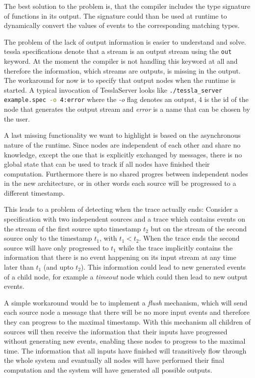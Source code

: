 The best solution to the problem is, that the compiler includes the type signature of functions in its output.
The signature could than be used at runtime to dynamically convert the values of events to the corresponding matching types.

The problem of the lack of output information is easier to understand and solve.
\gls{tessla} specifications denote that a stream is an output stream using the \lstinline{out} keyword.
At the moment the compiler is not handling this keyword at all and therefore the information, which streams are outputs, is missing in the output.
The workaround for now is to specify that output nodes when the runtime is started.
A typical invocation of TesslaServer looks like
\lstinline[breaklines=true,breakatwhitespace=true,language=bash]{./tessla_server example.spec -o 4:error}
where the \emph{-o} flag denotes an output, 4 is the id of the node that generates the output stream and \emph{error} is a name that can be chosen by the user.

A last missing functionality we want to highlight is based on the asynchronous nature of the runtime.
Since nodes are independent of each other and share no knowledge, except the one that is explicitly exchanged by messages, there is no global state that can be used to track if all nodes have finished their computation.
Furthermore there is no shared progres between independent nodes in the new architecture, or in other words each source will be progressed to a different timestamp.

This leads to a problem of detecting when the trace actually ends: Consider a specification with two independent sources and a trace which contains events on the stream of the first source upto timestamp \(t_2\) but on the stream of the second source only to the timestamp \(t_1\), with \(t_1 < t_2\).
When the trace ends the second source will have only progressed to \(t_1\) while the trace implicitly contains the information that there is no event happening on its input stream at any time later than \(t_1\) (and upto \(t_2\)).
This information could lead to new generated events of a child node, for example a \emph{timeout} node which could then lead to new output events.

A simple workaround would be to implement a \emph{flush} mechanism, which will send each source node a message that there will be no more input events and therefore they can progress to the maximal timestamp.
With this mechanism all children of sources will then receive the information that their inputs have progressed without generating new events, enabling these nodes to progress to the maximal time.
The information that all inputs have finished will transitively flow through the whole system and evantually all nodes will have performed their final computation and the system will have generated all possible outputs.

